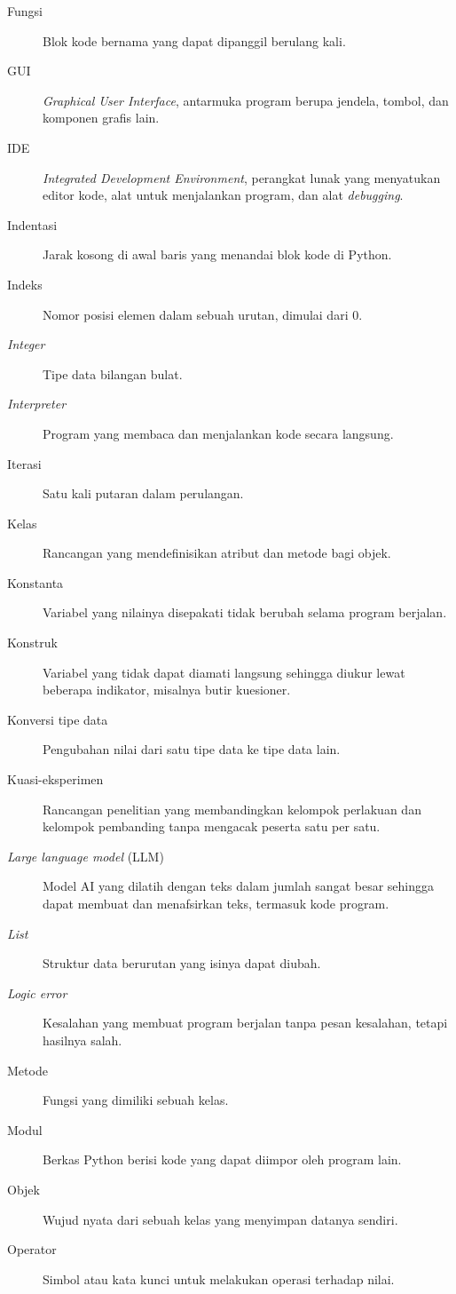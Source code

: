 \begin{description}
  \item[Fungsi] Blok kode bernama yang dapat dipanggil berulang kali.
  \item[GUI] \textit{Graphical User Interface}, antarmuka program berupa jendela, tombol, dan komponen grafis lain.
  \item[IDE] \textit{Integrated Development Environment}, perangkat lunak yang menyatukan editor kode, alat untuk menjalankan program, dan alat \textit{debugging}.
  \item[Indentasi] Jarak kosong di awal baris yang menandai blok kode di Python.
  \item[Indeks] Nomor posisi elemen dalam sebuah urutan, dimulai dari 0.
  \item[\textit{Integer}] Tipe data bilangan bulat.
  \item[\textit{Interpreter}] Program yang membaca dan menjalankan kode secara langsung.
  \item[Iterasi] Satu kali putaran dalam perulangan.
  \item[Kelas] Rancangan yang mendefinisikan atribut dan metode bagi objek.
  \item[Konstanta] Variabel yang nilainya disepakati tidak berubah selama program berjalan.
  \item[Konstruk] Variabel yang tidak dapat diamati langsung sehingga diukur lewat beberapa indikator, misalnya butir kuesioner.
  \item[Konversi tipe data] Pengubahan nilai dari satu tipe data ke tipe data lain.
  \item[Kuasi-eksperimen] Rancangan penelitian yang membandingkan kelompok perlakuan dan kelompok pembanding tanpa mengacak peserta satu per satu.
  \item[\textit{Large language model} (LLM)] Model AI yang dilatih dengan teks dalam jumlah sangat besar sehingga dapat membuat dan menafsirkan teks, termasuk kode program.
  \item[\textit{List}] Struktur data berurutan yang isinya dapat diubah.
  \item[\textit{Logic error}] Kesalahan yang membuat program berjalan tanpa pesan kesalahan, tetapi hasilnya salah.
  \item[Metode] Fungsi yang dimiliki sebuah kelas.
  \item[Modul] Berkas Python berisi kode yang dapat diimpor oleh program lain.
  \item[Objek] Wujud nyata dari sebuah kelas yang menyimpan datanya sendiri.
  \item[Operator] Simbol atau kata kunci untuk melakukan operasi terhadap nilai.

\end{description}
